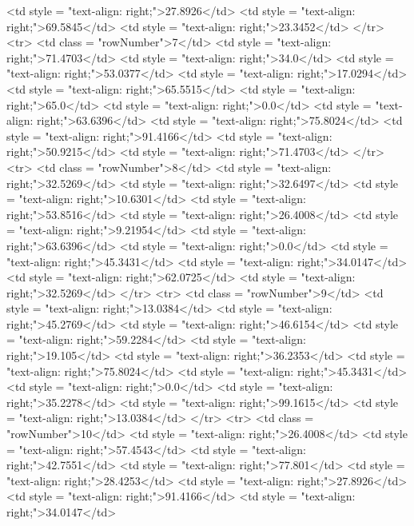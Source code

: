 \documentclass[12pt,a4paper]{article}
\begin{document}
      <td style = "text-align: right;">27.8926</td>
      <td style = "text-align: right;">69.5845</td>
      <td style = "text-align: right;">23.3452</td>
    </tr>
    <tr>
      <td class = "rowNumber">7</td>
      <td style = "text-align: right;">71.4703</td>
      <td style = "text-align: right;">34.0</td>
      <td style = "text-align: right;">53.0377</td>
      <td style = "text-align: right;">17.0294</td>
      <td style = "text-align: right;">65.5515</td>
      <td style = "text-align: right;">65.0</td>
      <td style = "text-align: right;">0.0</td>
      <td style = "text-align: right;">63.6396</td>
      <td style = "text-align: right;">75.8024</td>
      <td style = "text-align: right;">91.4166</td>
      <td style = "text-align: right;">50.9215</td>
      <td style = "text-align: right;">71.4703</td>
    </tr>
    <tr>
      <td class = "rowNumber">8</td>
      <td style = "text-align: right;">32.5269</td>
      <td style = "text-align: right;">32.6497</td>
      <td style = "text-align: right;">10.6301</td>
      <td style = "text-align: right;">53.8516</td>
      <td style = "text-align: right;">26.4008</td>
      <td style = "text-align: right;">9.21954</td>
      <td style = "text-align: right;">63.6396</td>
      <td style = "text-align: right;">0.0</td>
      <td style = "text-align: right;">45.3431</td>
      <td style = "text-align: right;">34.0147</td>
      <td style = "text-align: right;">62.0725</td>
      <td style = "text-align: right;">32.5269</td>
    </tr>
    <tr>
      <td class = "rowNumber">9</td>
      <td style = "text-align: right;">13.0384</td>
      <td style = "text-align: right;">45.2769</td>
      <td style = "text-align: right;">46.6154</td>
      <td style = "text-align: right;">59.2284</td>
      <td style = "text-align: right;">19.105</td>
      <td style = "text-align: right;">36.2353</td>
      <td style = "text-align: right;">75.8024</td>
      <td style = "text-align: right;">45.3431</td>
      <td style = "text-align: right;">0.0</td>
      <td style = "text-align: right;">35.2278</td>
      <td style = "text-align: right;">99.1615</td>
      <td style = "text-align: right;">13.0384</td>
    </tr>
    <tr>
      <td class = "rowNumber">10</td>
      <td style = "text-align: right;">26.4008</td>
      <td style = "text-align: right;">57.4543</td>
      <td style = "text-align: right;">42.7551</td>
      <td style = "text-align: right;">77.801</td>
      <td style = "text-align: right;">28.4253</td>
      <td style = "text-align: right;">27.8926</td>
      <td style = "text-align: right;">91.4166</td>
      <td style = "text-align: right;">34.0147</td>
\end{document}
